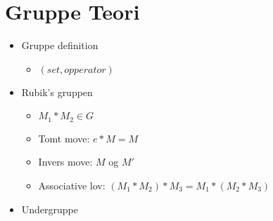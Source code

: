 \section{Gruppe Teori}
\begin{frame}
\begin{itemize}
	\item Gruppe definition 
	\begin{itemize}
		\item  $(set,opperator)$ 
	\end{itemize}
	\item Rubik's gruppen
	\begin{itemize}
		\item $M_1 * M_2 \in G$ 
		\item Tomt move: $e*M=M$
		\item Invers move: $M$ og $M'$
		\item Associative lov: $(M_1 * M_2) * M_3 = M_1 * (M_2 * M_3)$
	\end{itemize}
	\item Undergruppe
\end{itemize}
\end{frame}